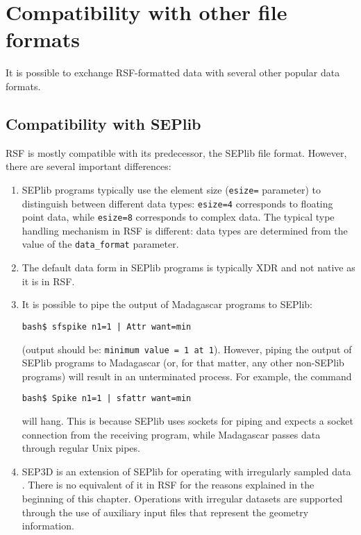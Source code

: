 \section{Compatibility with other file formats}

It is possible to exchange RSF-formatted data with several other popular data formats.

\subsection{Compatibility with SEPlib}

RSF is mostly compatible with its predecessor, the SEPlib file format.
However, there are several important differences:
\begin{enumerate}
\item SEPlib programs typically use the element size (\texttt{esize=}
parameter) to distinguish between different data types:
\texttt{esize=4} corresponds to floating point data, while
\texttt{esize=8} corresponds to complex data. The typical type
handling mechanism in RSF is different: 
data types are determined from the value of the \texttt{data\_format} parameter.
\item The default data form in SEPlib programs is
typically XDR and not native as it is in RSF. 
\item It is possible to pipe the
output of Madagascar programs to SEPlib:
\begin{verbatim}
bash$ sfspike n1=1 | Attr want=min
\end{verbatim}
(output should be: \texttt{minimum value = 1 at 1}).
However, piping the output of SEPlib programs to Madagascar (or, for that matter, any
other non-SEPlib programs) will result in an unterminated process. For example, the command
\begin{verbatim}
bash$ Spike n1=1 | sfattr want=min
\end{verbatim}
will hang. This is 
because SEPlib uses sockets for piping and expects a socket
connection from the receiving program, while Madagascar passes data through regular Unix
pipes.
\item SEP3D is an extension of SEPlib for operating with irregularly sampled
  data \cite[]{Biondi.sep.92.343}. There is no equivalent of it in RSF for
  the reasons explained in the beginning of this chapter. Operations with
  irregular datasets are supported through the use of auxiliary input files
  that represent the geometry information.
\end{enumerate}

